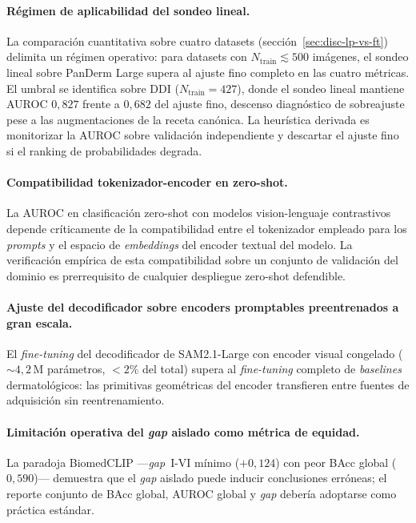 \paragraph{Régimen de aplicabilidad del sondeo lineal.}
La comparación cuantitativa sobre cuatro datasets
(sección~\ref{sec:disc-lp-vs-ft}) delimita un régimen operativo: para
datasets con $N_{\mathrm{train}} \lesssim 500$ imágenes, el sondeo
lineal sobre PanDerm Large supera al ajuste fino completo en las cuatro
métricas. El umbral se identifica sobre DDI ($N_{\mathrm{train}} = 427$),
donde el sondeo lineal mantiene AUROC $0{,}827$ frente a $0{,}682$ del
ajuste fino, descenso diagnóstico de sobreajuste pese a las
augmentaciones de la receta canónica. La heurística derivada es
monitorizar la AUROC sobre validación independiente y descartar el
ajuste fino si el ranking de probabilidades degrada.

\paragraph{Compatibilidad tokenizador-encoder en zero-shot.}
La AUROC en clasificación zero-shot con modelos vision-lenguaje
contrastivos depende críticamente de la compatibilidad entre el
tokenizador empleado para los \emph{prompts} y el espacio de
\emph{embeddings} del encoder textual del modelo. La verificación
empírica de esta compatibilidad sobre un conjunto de validación
del dominio es prerrequisito de cualquier despliegue zero-shot
defendible.

\paragraph{Ajuste del decodificador sobre encoders promptables
preentrenados a gran escala.}
El \emph{fine-tuning} del decodificador de SAM2.1-Large con encoder
visual congelado (${\sim}4{,}2$\,M parámetros, $<2\%$ del total) supera
al \emph{fine-tuning} completo de \emph{baselines} dermatológicos: las
primitivas geométricas del encoder transfieren entre fuentes de
adquisición sin reentrenamiento.

\paragraph{Limitación operativa del \emph{gap} aislado como métrica
de equidad.}
La paradoja BiomedCLIP ---\emph{gap}~I-VI mínimo ($+0{,}124$) con peor
BAcc global ($0{,}590$)--- demuestra que el \emph{gap} aislado puede
inducir conclusiones erróneas; el reporte conjunto de BAcc global,
AUROC global y \emph{gap} debería adoptarse como práctica estándar.

